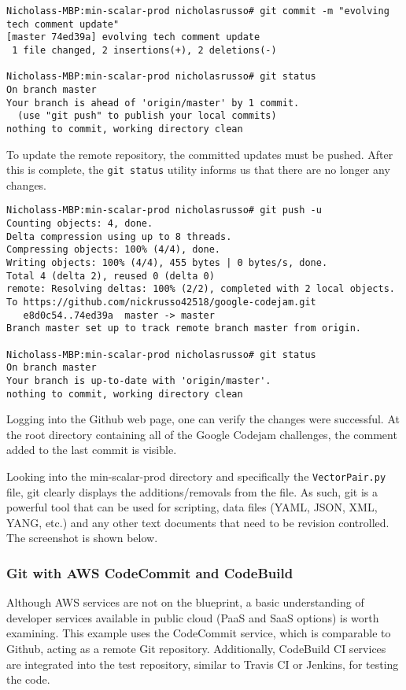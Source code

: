 \begin{verbatim}
Nicholass-MBP:min-scalar-prod nicholasrusso# git commit -m "evolving tech comment update"
[master 74ed39a] evolving tech comment update
 1 file changed, 2 insertions(+), 2 deletions(-)

Nicholass-MBP:min-scalar-prod nicholasrusso# git status
On branch master
Your branch is ahead of 'origin/master' by 1 commit.
  (use "git push" to publish your local commits)
nothing to commit, working directory clean
\end{verbatim}

To update the remote repository, the committed updates must be pushed. After
this is complete, the \verb|git status| utility informs us that there are no
longer any changes.

\begin{verbatim}
Nicholass-MBP:min-scalar-prod nicholasrusso# git push -u
Counting objects: 4, done.
Delta compression using up to 8 threads.
Compressing objects: 100% (4/4), done.
Writing objects: 100% (4/4), 455 bytes | 0 bytes/s, done.
Total 4 (delta 2), reused 0 (delta 0)
remote: Resolving deltas: 100% (2/2), completed with 2 local objects.
To https://github.com/nickrusso42518/google-codejam.git
   e8d0c54..74ed39a  master -> master
Branch master set up to track remote branch master from origin.

Nicholass-MBP:min-scalar-prod nicholasrusso# git status
On branch master
Your branch is up-to-date with 'origin/master'.
nothing to commit, working directory clean
\end{verbatim}

Logging into the Github web page, one can verify the changes were successful. At
the root directory containing all of the Google Codejam challenges, the
comment added to the last commit is visible.


Looking into the min-scalar-prod directory and specifically the \verb|VectorPair.py|
file, git clearly displays the additions/removals from the file. As such, git
is a powerful tool that can be used for scripting, data files (YAML, JSON,
XML, YANG, etc.) and any other text documents that need to be revision
controlled. The screenshot is shown below.


\subsubsection{Git with AWS CodeCommit and CodeBuild}
Although AWS services are not on the blueprint, a basic understanding of
developer services available in public cloud (PaaS and SaaS options) is worth
examining. This example uses the CodeCommit service, which is comparable to
Github, acting as a remote Git repository. Additionally, CodeBuild CI services
are integrated into the test repository, similar to Travis CI or Jenkins, for
testing the code.

